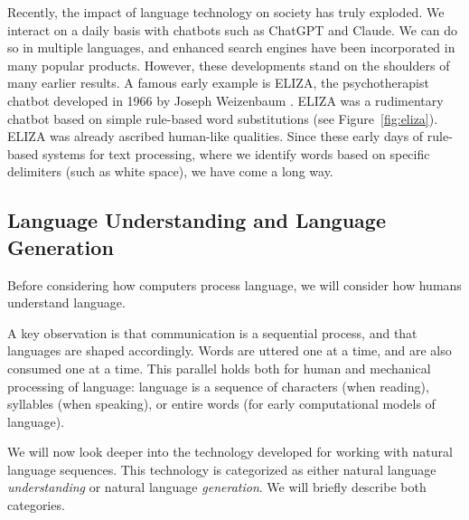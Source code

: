 Recently, the impact of language technology on society has truly exploded. We interact on a daily basis with chatbots such as ChatGPT and Claude. We can do so in multiple languages, and enhanced search engines have been incorporated in many popular products. However, these developments stand on the shoulders of many earlier results. A famous early example is ELIZA, the psychotherapist chatbot developed in 1966 by Joseph Weizenbaum \citep{10.1145/365153.365168}. ELIZA was a rudimentary chatbot based on simple rule-based word substitutions (see Figure~\ref{fig:eliza}). ELIZA was already ascribed human-like qualities. Since these early days of rule-based systems for text processing, where we identify words based on specific delimiters (such as white space), we have come a long way. %

\subsection{Language Understanding and Language Generation}
Before considering how computers process language, we will consider how humans understand language. 

A key observation is that communication is a sequential process, and that languages are shaped accordingly. Words are uttered one at a time, and are also consumed one at a time. This parallel holds both for human and mechanical processing of language: language is a sequence of characters (when reading), syllables (when speaking), or entire words (for early computational models of language). 

We will now look deeper into the technology developed for working with  natural language sequences. This technology is categorized as either  natural language {\em understanding} or natural language {\em generation}. We will briefly describe both categories.

